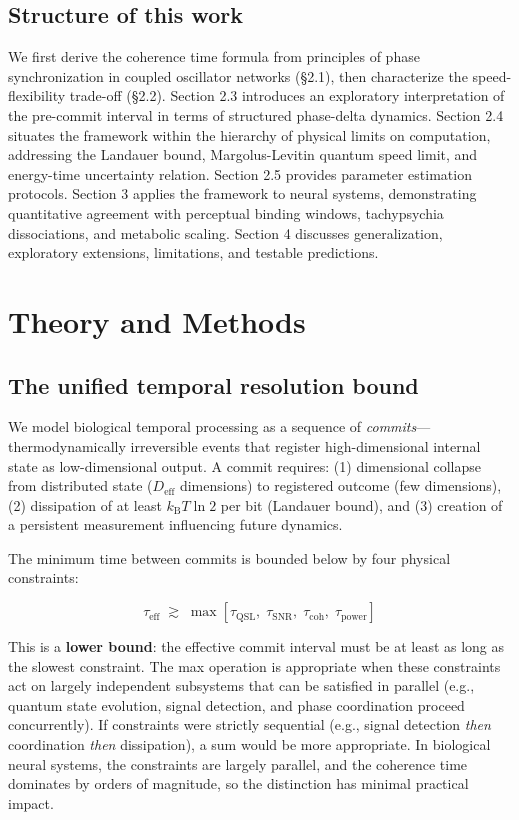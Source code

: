 \documentclass[12pt]{article}
\newcommand{\kB}{k_{\mathrm{B}}}
\newcommand{\Deff}{D_{\mathrm{eff}}}
\begin{document}
\subsection{Structure of this work}

We first derive the coherence time formula from principles of phase synchronization in coupled oscillator networks (\S2.1), then characterize the speed-flexibility trade-off (\S2.2). Section 2.3 introduces an exploratory interpretation of the pre-commit interval in terms of structured phase-delta dynamics. Section 2.4 situates the framework within the hierarchy of physical limits on computation, addressing the Landauer bound, Margolus-Levitin quantum speed limit, and energy-time uncertainty relation. Section 2.5 provides parameter estimation protocols. Section 3 applies the framework to neural systems, demonstrating quantitative agreement with perceptual binding windows, tachypsychia dissociations, and metabolic scaling. Section 4 discusses generalization, exploratory extensions, limitations, and testable predictions.

\section{Theory and Methods}

\subsection{The unified temporal resolution bound}

We model biological temporal processing as a sequence of \emph{commits}---thermodynamically irreversible events that register high-dimensional internal state as low-dimensional output. A commit requires: (1) dimensional collapse from distributed state ($\Deff$ dimensions) to registered outcome (few dimensions), (2) dissipation of at least $\kB T \ln 2$ per bit (Landauer bound), and (3) creation of a persistent measurement influencing future dynamics.

The minimum time between commits is bounded below by four physical constraints:

\begin{equation}\label{eq:main-bound}
\boxed{\tau_{\mathrm{eff}} \;\gtrsim\; \max\left[\tau_{\mathrm{QSL}},\; \tau_{\mathrm{SNR}},\; \tau_{\mathrm{coh}},\; \tau_{\mathrm{power}}\right]}
\end{equation}

This is a \textbf{lower bound}: the effective commit interval must be at least as long as the slowest constraint. The max operation is appropriate when these constraints act on largely independent subsystems that can be satisfied in parallel (e.g., quantum state evolution, signal detection, and phase coordination proceed concurrently). If constraints were strictly sequential (e.g., signal detection \emph{then} coordination \emph{then} dissipation), a sum would be more appropriate. In biological neural systems, the constraints are largely parallel, and the coherence time dominates by orders of magnitude, so the distinction has minimal practical impact.
\end{document}

